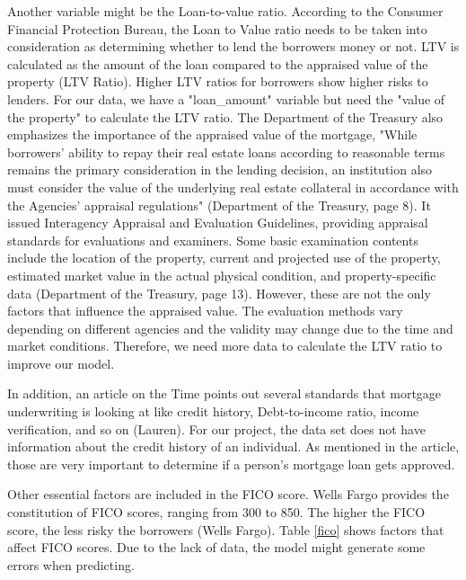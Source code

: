 \documentclass{jpp}
\begin{document}
Another variable might be the Loan-to-value ratio. According to the Consumer Financial Protection Bureau, the Loan to Value ratio needs to be taken into consideration as determining whether to lend the borrowers money or not. LTV is calculated as the amount of the loan compared to the appraised value of the property (LTV Ratio). Higher LTV ratios for borrowers show higher risks to lenders. For our data, we have a "loan\_amount" variable but need the "value of the property" to calculate the LTV ratio. The Department of the Treasury also emphasizes the importance of the appraised value of the mortgage, "While borrowers’ ability to repay their real estate loans according to reasonable terms remains the primary consideration in the lending decision, an institution also must consider the value of the underlying real estate collateral in accordance with the Agencies’ appraisal regulations" (Department of the Treasury, page 8). It issued Interagency Appraisal and Evaluation Guidelines, providing appraisal standards for evaluations and examiners. Some basic examination contents include the location of the property, current and projected use of the property, estimated market value in the actual physical condition, and property-specific data (Department of the Treasury, page 13). However, these are not the only factors that influence the appraised value. The evaluation methods vary depending on different agencies and the validity may change due to the time and market conditions. Therefore, we need more data to calculate the LTV ratio to improve our model.

In addition, an article on the Time points out several standards that mortgage underwriting is looking at like credit history, Debt-to-income ratio, income verification, and so on (Lauren). For our project, the data set does not have information about the credit history of an individual. As mentioned in the article, those are very important to determine if a person’s mortgage loan gets approved. 

Other essential factors are included in the FICO score. Wells Fargo provides the constitution of FICO scores, ranging from 300 to 850. The higher the FICO score, the less risky the borrowers (Wells Fargo). Table \ref{fico} shows factors that affect FICO scores. Due to the lack of data, the model might generate some errors when predicting. 
\end{document}
